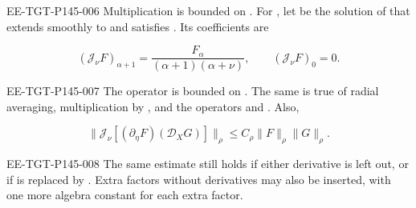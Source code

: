 \begin{lemma}\label{lem:B.1}
\begin{EESegment}{EE-TGT-P145-006}
Multiplication is bounded on . For
, let  be the solution
 of
 that extends smoothly to
 and satisfies . Its coefficients are
\end{EESegment}
\begin{equation}
  (\mathcal J_\nu F)_{\alpha+1}
  =\frac{F_\alpha}{(\alpha+1)(\alpha+\nu)},
  \qquad (\mathcal J_\nu F)_0=0.
  \tag{B.5}\label{eq:B.5}
\end{equation}
\begin{EESegment}{EE-TGT-P145-007}
The operator  is bounded on
. The same is true of radial averaging, multiplication by
, and the operators  and
. Also,
\end{EESegment}
\begin{equation}
  \bigl\lVert\mathcal J_\nu[(\partial_\eta F)(\mathcal D_XG)]\bigr\rVert_\rho
  \leq C_\rho\lVert F\rVert_\rho\lVert G\rVert_\rho.
  \tag{B.6}\label{eq:B.6}
\end{equation}
\begin{EESegment}{EE-TGT-P145-008}
The same estimate still holds if either derivative is left out, or if  is
replaced by . Extra factors without derivatives may also be
inserted, with one more algebra constant for each extra factor.
\end{EESegment}
\end{lemma}

